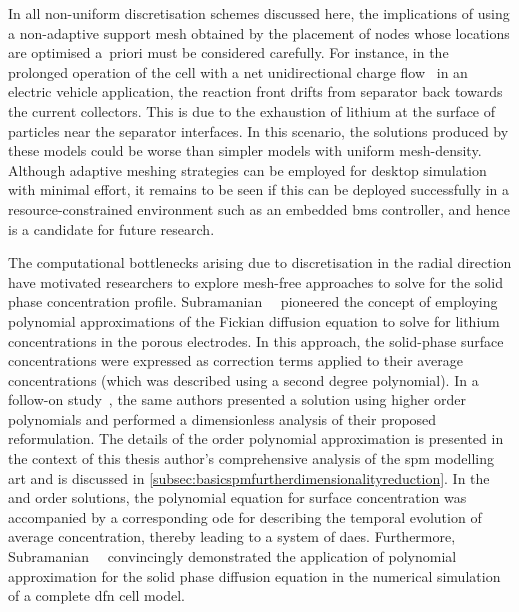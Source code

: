 
In all  non-uniform discretisation schemes  discussed here, the  implications of
using  a non-adaptive  support mesh  obtained by  the placement  of nodes  whose
locations are optimised a~priori must  be considered carefully. For instance, in
the prolonged operation of the cell with a net unidirectional charge flow \eg~in
an electric vehicle  application, the reaction front drifts  from separator back
towards the current collectors. This is due  to the exhaustion of lithium at the
surface  of particles  near  the  separator interfaces.  In  this scenario,  the
solutions  produced by  these models  could be  worse than  simpler models  with
uniform mesh-density. Although  adaptive meshing strategies can  be employed for
desktop simulation  with minimal effort,  it remains to be  seen if this  can be
deployed successfully in a resource-constrained  environment such as an embedded
\gls{bms} controller, and hence is a candidate for future research.


The   computational   bottlenecks  arising   due   to   discretisation  in   the
radial   direction    have   motivated   researchers   to    explore   mesh-free
approaches   to    solve   for   the   solid    phase   concentration   profile.
Subramanian~\etal~\cite{Subramanian2004}  pioneered  the  concept  of  employing
polynomial approximations of the Fickian diffusion equation to solve for lithium
concentrations  in the  porous  electrodes. In  this  approach, the  solid-phase
surface  concentrations were  expressed  as correction  terms  applied to  their
average concentrations (which  was described using a  second degree polynomial).
In  a  follow-on  study~\cite{Subramanian2005},  the same  authors  presented  a
solution using higher  order polynomials and performed  a dimensionless analysis
of  their proposed  reformulation.  The details  of  the   order
polynomial approximation  is presented  in the context  of this  thesis author's
comprehensive  analysis of  the  \gls{spm}  modelling art  and  is discussed  in
\cref{subsec:basicspmfurtherdimensionalityreduction}.  In  the  
and    order  solutions,  the polynomial  equation  for  surface
concentration  was  accompanied  by  a corresponding  \gls{ode}  for  describing
the  temporal  evolution   of  average  concentration,  thereby   leading  to  a
system  of \glspl{dae}.  Furthermore, Subramanian~\etal{}~\cite{Subramanian2007}
convincingly demonstrated  the application  of polynomial approximation  for the
solid  phase  diffusion equation  in  the  numerical  simulation of  a  complete
\gls{dfn} cell model.


